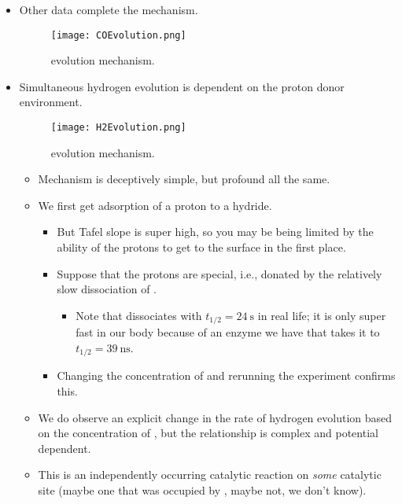 \documentclass[../notes.tex]{subfiles}
\begin{document}
\begin{itemize}
\begin{itemize}
    \end{itemize}
    \item Other data complete the mechanism.
    \begin{figure}[H]
        \centering
        \texttt{[image: COEvolution.png]}
        \caption{ evolution mechanism.}
        \label{fig:COEvolution}
    \end{figure}
    \item Simultaneous hydrogen evolution is dependent on the proton donor environment.
    \begin{figure}[h!]
        \centering
        \texttt{[image: H2Evolution.png]}
        \caption{ evolution mechanism.}
        \label{fig:H2Evolution}
    \end{figure}
    \begin{itemize}
        \item Mechanism is deceptively simple, but profound all the same.
        \item We first get adsorption of a proton to a hydride.
        \begin{itemize}
            \item But Tafel slope is super high, so you may be being limited by the ability of the protons to get to the surface in the first place.
            \item Suppose that the protons are special, i.e., donated by the relatively slow dissociation of .
            \begin{itemize}
                \item Note that  dissociates with $t_{1/2}=\SI{24}{\second}$ in real life; it is only super fast in our body because of an enzyme we have that takes it to $t_{1/2}=\SI{39}{\nano\second}$.
            \end{itemize}
            \item Changing the concentration of  and rerunning the experiment confirms this.
        \end{itemize}
        \item We do observe an explicit change in the rate of hydrogen evolution based on the concentration of , but the relationship is complex and potential dependent.
        \item This is an independently occurring catalytic reaction on \emph{some} catalytic site (maybe one that was occupied by , maybe not, we don't know).
    \end{itemize}

\end{itemize}
\end{document}
